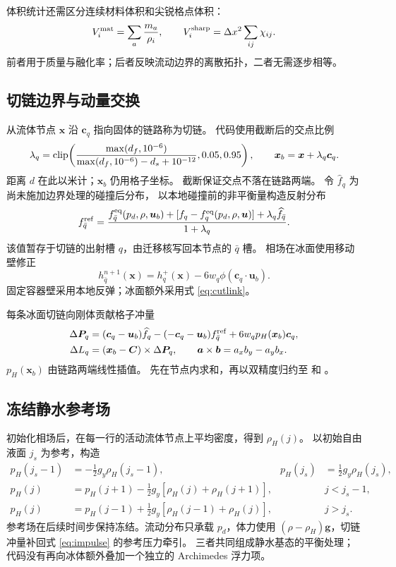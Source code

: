 体积统计还需区分连续材料体积和尖锐格点体积：
\begin{equation}
 V_i^{\rm mat}=\sum_a\frac{m_a}{\rho_i},\qquad
 V_i^{\rm sharp}=\Delta x^2\sum_{ij}\chi_{ij}.
\end{equation}
前者用于质量与融化率；后者反映流动边界的离散拓扑，二者无需逐步相等。


\subsection{切链边界与动量交换}
从流体节点 $\bm x$ 沿 $\bm c_q$ 指向固体的链路称为切链。
代码使用截断后的交点比例
\begin{equation}
 \lambda_q=\operatorname{clip}\!\left(\frac{\max(d_f,10^{-6})}
 {\max(d_f,10^{-6})-d_s+10^{-12}},0.05,0.95\right),\qquad
 \bm x_b=\bm x+\lambda_q\bm c_q.
\end{equation}
距离 $d$ 在此以米计；$\bm x_b$ 仍用格子坐标。
截断保证交点不落在链路两端。
令 $\widehat f_q$ 为尚未施加边界处理的碰撞后分布，
以本地碰撞前的非平衡量构造反射分布
\begin{equation}
 f_{\bar q}^{\rm ref}=
 \frac{f_{\bar q}^{\rm eq}(p_d,\rho,\bm u_b)
 +[f_q-f_q^{\rm eq}(p_d,\rho,\bm u)]
 +\lambda_q\widehat f_{\bar q}}{1+\lambda_q}.
 \label{eq:cutlink}
\end{equation}
该值暂存于切链的出射槽 $q$，由迁移核写回本节点的 $\bar q$ 槽。
相场在冰面使用移动壁修正
\begin{equation}
 h_{\bar q}^{n+1}(\bm x)=h_q^+(\bm x)
 -6w_q\phi(\bm c_q\cdot\bm u_b).
\end{equation}
固定容器壁采用本地反弹；冰面额外采用式 \eqref{eq:cutlink}。

每条冰面切链向刚体贡献格子冲量
\begin{align}
 \Delta\bm P_q={}&(\bm c_q-\bm u_b)\widehat f_q
 -(-\bm c_q-\bm u_b)f_{\bar q}^{\rm ref}
 +6w_qp_H(\bm x_b)\bm c_q,\label{eq:impulse}\\
 \Delta L_q={}&(\bm x_b-\bm C)\times\Delta\bm P_q,
 \qquad \bm a\times\bm b=a_xb_y-a_yb_x.
\end{align}
$p_H(\bm x_b)$ 由链路两端线性插值。
先在节点内求和，再以双精度归约至  和
。

\subsection{冻结静水参考场}
初始化相场后，在每一行的活动流体节点上平均密度，得到 $\rho_H(j)$。
以初始自由液面 $j_s$ 为参考，构造
\begin{align}
 p_H(j_s-1)&=-\tfrac12g_y\rho_H(j_s-1),&
 p_H(j_s)&=\tfrac12g_y\rho_H(j_s),\\
 p_H(j)&=p_H(j+1)-\tfrac12g_y[\rho_H(j)+\rho_H(j+1)],&&j<j_s-1,\\
 p_H(j)&=p_H(j-1)+\tfrac12g_y[\rho_H(j-1)+\rho_H(j)],&&j>j_s.
\end{align}
参考场在后续时间步保持冻结。流动分布只承载 $p_d$，体力使用
$(\rho-\rho_H)\bm g$，切链冲量补回式 \eqref{eq:impulse} 的参考压力牵引。
三者共同组成静水基态的平衡处理；代码没有再向冰体额外叠加一个独立的
Archimedes 浮力项。

